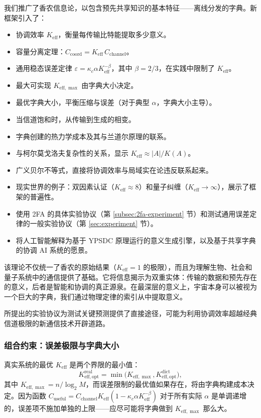 \documentclass[12pt,a4paper]{article}
\theoremstyle{remark}
\newcommand{\Keff}{K_{\mathrm{eff}}}
\newcommand{\Keffopt}{K_{\mathrm{eff},\mathrm{opt}}}
\newcommand{\Keffmax}{K_{\mathrm{eff},\max}}
\begin{document}
	我们推广了香农信息论，以包含预先共享知识的基本特征——离线分发的字典。新框架引入了：
	\begin{itemize}
		\item 协调效率 $\Keff$，衡量每传输比特能提取多少意义。
		\item 容量分离定理：$C_{\text{coord}} = \Keff \, C_{\text{channel}}$。
		\item 通用稳态误差定律 $\varepsilon = \kappa_c\alpha K_{\mathrm{eff}}^{-\beta}$，其中 $\beta=2/3$，在实践中限制了 $\Keff$。
		\item 最大可实现 $\Keffmax$ 由字典大小决定。
		\item 最优字典大小，平衡压缩与误差（对于典型 $\alpha$，字典大小主导）。
		\item 当信道饱和时，从传输到生成的相变。
		\item 字典创建的热力学成本及其与兰道尔原理的联系。
		\item 与柯尔莫戈洛夫复杂性的关系，显示 $\Keff \approx |A|/K(A)$。
		\item 广义贝尔不等式，直接将协调效率与局域实在论违反联系起来。
		\item 现实世界的例子：双因素认证（$\Keff \approx 8$）和量子纠缠（$\Keff \to \infty$），展示了框架的普遍性。
		\item 使用 2FA 的具体实验协议（第 \ref{subsec:2fa-experiment} 节）和测试通用误差定律的一般实验协议（第 \ref{sec:experiment} 节）。
		\item 将人工智能解释为基于 YPSDC 原理运行的意义生成引擎，以及基于共享字典的协调 AI 系统的愿景。
	\end{itemize}
	
	该理论不仅统一了香农的原始结果（$\Keff=1$ 的极限），而且为理解生物、社会和量子系统中的通信提供了基础。它将信息揭示为双重实体：传输的数据和预先存在的意义，后者是智能和协调的真正源泉。在最深层的意义上，宇宙本身可以被视为一个巨大的字典，我们通过物理定律的索引从中提取意义。
	
	所提出的实验协议为测试关键预测提供了直接途径，可能为利用协调效率超越经典信道极限的新通信技术开辟道路。
	
	\subsubsection{组合约束：误差极限与字典大小}
	真实系统的最优 $\Keff$ 是两个界限的最小值：
	\[
	\Keffopt^{\text{real}} = \min\bigl( \Keffmax, \Keffopt^{\text{dict}} \bigr),
	\]
	其中 $\Keffmax = n / \log_2 M$，而误差限制的最优值如果存在，将由字典构建成本决定。因为函数 $C_{\text{useful}} = C_{\text{channel}} \Keff (1 - \kappa_c\alpha K_{\mathrm{eff}}^{-\beta})$ 对于所有实际 $\alpha$ 是单调递增的，误差项不施加单独的上限——应尽可能将字典做到 $\Keffmax$ 那么大。
	
\end{document}
